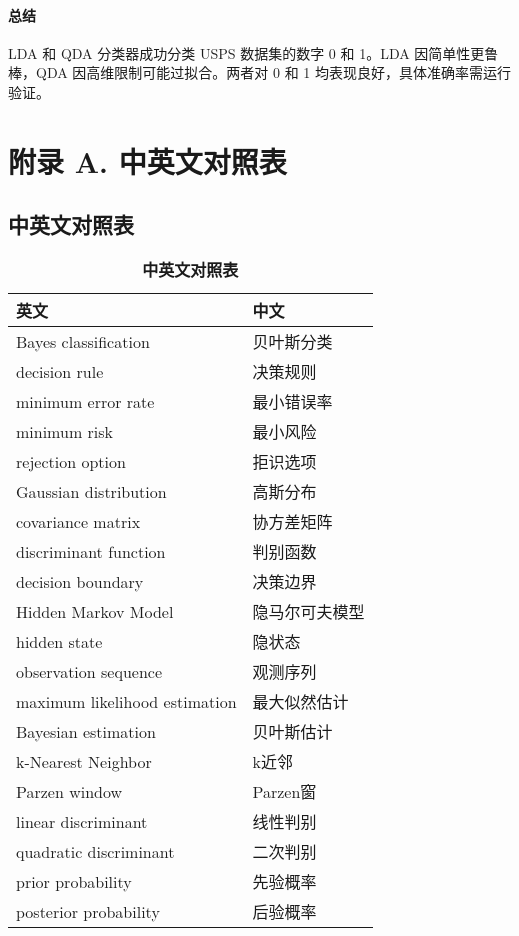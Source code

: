 \documentclass[UTF8]{report}
\theoremstyle{MyLineTheoremStyle} %
\theoremstyle{MyBlockTheoremStyle} %
\theoremstyle{MySubsubsectionStyle} %
\begin{document}
\subsubsection{总结}
LDA 和 QDA 分类器成功分类 USPS 数据集的数字 0 和 1。LDA 因简单性更鲁棒，QDA 因高维限制可能过拟合。两者对 0 和 1 均表现良好，具体准确率需运行验证。

\chapter*{附录 A. 中英文对照表}   
\thispagestyle{plain} 
\setcounter{section}{0}   
\renewcommand\thesection{A.\arabic{section}}   
\renewcommand{\thefigure}{A.\arabic{figure}} 
\renewcommand{\thetable}{A.\arabic{table}}

\section{中英文对照表}
\begin{multicols}{2}  

\begin{table}[H]
\centering
\caption{\textbf{中英文对照表}}
\begin{tabular}{ll}
\toprule
英文 & 中文 \\
\midrule
Bayes classification & 贝叶斯分类 \\
decision rule & 决策规则 \\
minimum error rate & 最小错误率 \\
minimum risk & 最小风险 \\
rejection option & 拒识选项 \\
Gaussian distribution & 高斯分布 \\
covariance matrix & 协方差矩阵 \\
discriminant function & 判别函数 \\
decision boundary & 决策边界 \\
Hidden Markov Model & 隐马尔可夫模型 \\
hidden state & 隐状态 \\
observation sequence & 观测序列 \\
maximum likelihood estimation & 最大似然估计 \\
Bayesian estimation & 贝叶斯估计 \\
k-Nearest Neighbor & k近邻 \\
Parzen window & Parzen窗 \\
linear discriminant & 线性判别 \\
quadratic discriminant & 二次判别 \\
prior probability & 先验概率 \\
posterior probability & 后验概率 \\
\bottomrule
\end{tabular}
\end{table}

\end{multicols}
\end{document}
